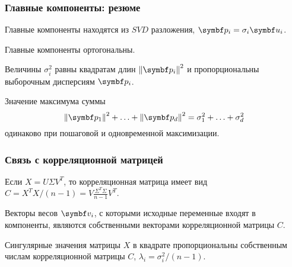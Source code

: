 \begin{frame}
  \frametitle{Главные компоненты: резюме}

  Главные компоненты находятся из $SVD$ разложения, $\bp_i = \sigma_i \bu_i$. \pause

  Главные компоненты ортогональны. 

  Величины $\sigma^2_i$ равны квадратам длин $\norm{\bp_i}^2$ 
  и пропорциональны выборочным дисперсиям $\bp_i$.  \pause

Значение максимума суммы 
\[
  \norm{\bp_1}^2 + \ldots + \norm{\bp_d}^2 = \sigma^2_1 + \ldots + \sigma^2_d
\]
одинаково при пошаговой и одновременной максимизации.


\end{frame}


\begin{frame}
  \frametitle{Связь с корреляционной матрицей}
  Если $X = U\Sigma V^T$, то корреляционная матрица имеет вид $C=X^TX/(n-1) = V\frac{\Sigma^T \Sigma}{n-1} V^T$. \pause

  Векторы весов $\bv_i$, с которыми исходные переменные входят в компоненты, являются
  собственными векторами корреляционной матрицы $C$. \pause

  Сингулярные значения матрицы $X$ в квадрате пропорциональны собственным числам 
  корреляционной матрицы $C$, $\lambda_i = \sigma_i^2 / (n-1)$.
  

\end{frame}